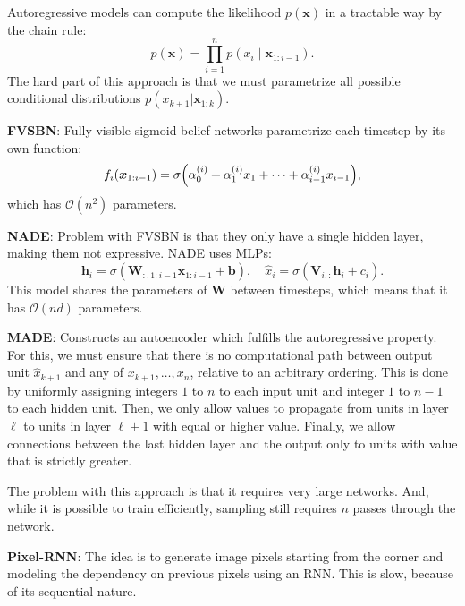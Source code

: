\documentclass{article}
\newcommand{\lft}{\mathopen{}\mathclose\bgroup\left}
\newcommand{\rgt}{\aftergroup\egroup\right}
\renewcommand{\vec}[1]{\bm{#1}}
\newcommand{\mat}[1]{\bm{#1}}
\newenvironment{topic}[1]
{\textbf{\sffamily \colorbox{black}{\rlap{\textbf{\textcolor{white}{#1}}}\hspace{\linewidth}\hspace{-2\fboxsep}}} \\ \vspace{0.2cm}}
{}
\begin{document}
\begin{multicols*}{2}
\begin{topic}{Autoencoders}
    \end{topic}

    \begin{topic}{Autoregressive models}

        Autoregressive models can compute the likelihood $p(\vec{x})$ in a tractable way by the chain rule: \[
            p(\vec{x}) = \prod_{i=1}^n p(x_i \mid \vec{x}_{1:i-1}).
        \]
        The hard part of this approach is that we must parametrize all possible conditional distributions
        $p(x_{k+1} | \vec{x}_{1:k})$.

        \textbf{FVSBN}: Fully visible sigmoid belief networks parametrize each timestep by its own function: \[
            f_i(\vec{x}_{1:i-1}) = \sigma \lft( \alpha_0^{(i)} + \alpha_1^{(i)} x_1 + \cdots + \alpha_{i-1}^{(i)} x_{i-1} \rgt),
        \]
        which has $\mathcal{O}(n^2)$ parameters.

        \textbf{NADE}: Problem with FVSBN is that they only have a single hidden layer, making them
        not expressive. NADE uses MLPs: \[
            \vec{h}_i = \sigma(\mat{W}_{:,1:i-1} \vec{x}_{1:i-1} + \vec{b}), \quad \hat{x}_i = \sigma(\mat{V}_{i,:} \vec{h}_i + c_i).
        \]
        This model shares the parameters of $\mat{W}$ between timesteps, which means that it has
        $\mathcal{O}(nd)$ parameters.

        \textbf{MADE}: Constructs an autoencoder which fulfills the autoregressive property. For this,
        we must ensure that there is no computational path between output unit $\hat{x}_{k+1}$ and
        any of $x_{k+1}, \ldots, x_n$, relative to an
        arbitrary ordering. This is done by uniformly assigning integers $1$ to $n$ to each input
        unit and integer $1$ to $n-1$ to each hidden unit. Then, we only allow values to propagate
        from units in layer $\ell$ to units in layer $\ell+1$ with equal or higher value. Finally,
        we allow connections between the last hidden layer and the output only to units with value
        that is strictly greater.

        The problem with this approach is that it requires very large networks. And, while it is possible
        to train efficiently, sampling still requires $n$ passes through the network.

        \textbf{Pixel-RNN}: The idea is to generate image pixels starting from the corner and
        modeling the dependency on previous pixels using an RNN. This is slow, because of its
        sequential nature.


\end{topic}
\end{multicols*}
\end{document}

